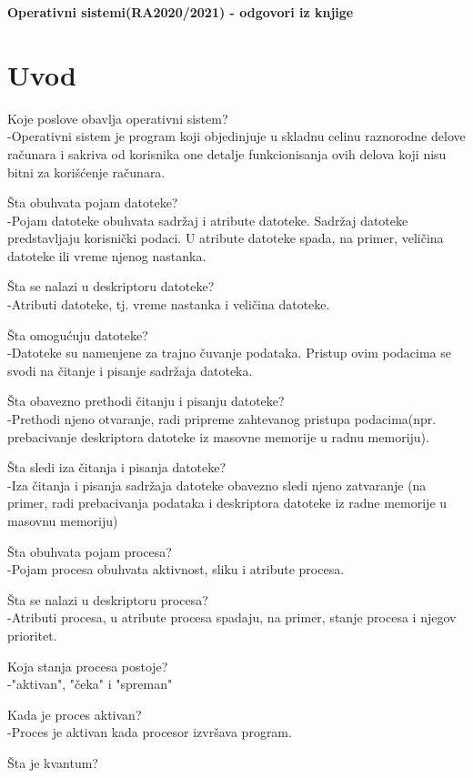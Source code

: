 \documentclass{article}
\begin{document}
\textbf{Operativni sistemi(RA2020/2021) - odgovori iz knjige}
\section{Uvod}
\enumerate{}
\item Koje poslove obavlja operativni sistem? \\
-Operativni sistem je program koji objedinjuje u skladnu celinu raznorodne delove
računara i sakriva od korisnika one detalje funkcionisanja ovih delova koji nisu bitni za
korišćenje računara.
\item Šta obuhvata pojam datoteke?\\
-Pojam datoteke obuhvata sadržaj i atribute datoteke. Sadržaj datoteke predstavljaju
korisnički podaci. U atribute datoteke spada, na primer, veličina datoteke ili vreme
njenog nastanka.
\item Šta se nalazi u deskriptoru datoteke?\\
-Atributi datoteke, tj. vreme nastanka i veličina datoteke.
\item Šta omogućuju datoteke?\\
-Datoteke su namenjene za trajno čuvanje podataka. Pristup ovim podacima se svodi
na čitanje i pisanje sadržaja datoteka.
\item Šta obavezno prethodi čitanju i pisanju datoteke?\\
-Prethodi njeno otvaranje, radi pripreme zahtevanog pristupa podacima(npr. prebacivanje
deskriptora datoteke iz masovne memorije u radnu memoriju).
\item Šta sledi iza čitanja i pisanja datoteke?\\
-Iza čitanja i
pisanja sadržaja datoteke obavezno sledi njeno zatvaranje (na primer, radi prebacivanja
podataka i deskriptora datoteke iz radne memorije u masovnu memoriju)
\item Šta obuhvata pojam procesa?\\
-Pojam procesa obuhvata aktivnost, sliku i atribute procesa.
\item Šta se nalazi u deskriptoru procesa?\\
-Atributi procesa, u atribute procesa spadaju, na
primer, stanje procesa i njegov prioritet.
\item Koja stanja procesa postoje?\\
-"aktivan", "čeka" i "spreman"
\item Kada je proces aktivan?\\
-Proces je aktivan kada procesor izvršava program.
\item Šta je kvantum?\\
\end{document}

